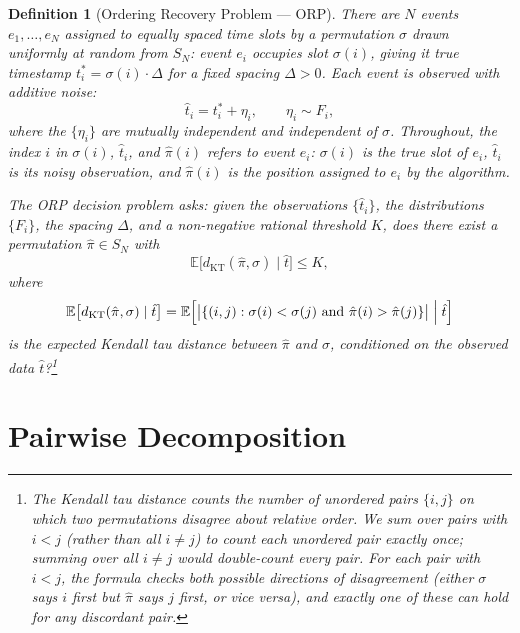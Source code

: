 \documentclass[11pt]{article}
\newtheorem{definition}{Definition}
\begin{document}
\begin{definition}[Ordering Recovery Problem --- ORP]
There are $N$ events $e_1, \ldots, e_N$ assigned to equally spaced time slots by a permutation $\sigma$ drawn uniformly at random from $S_N$: event $e_i$ occupies slot $\sigma(i)$, giving it true timestamp $t_i^* = \sigma(i) \cdot \Delta$ for a fixed spacing $\Delta > 0$. Each event is observed with additive noise:
\begin{equation}
\hat{t}_i = t_i^* + \eta_i, \qquad \eta_i \sim F_i,
\end{equation}
where the $\{\eta_i\}$ are mutually independent and independent of $\sigma$. Throughout, the index $i$ in $\sigma(i)$, $\hat{t}_i$, and $\hat{\pi}(i)$ refers to event $e_i$: $\sigma(i)$ is the true slot of $e_i$, $\hat{t}_i$ is its noisy observation, and $\hat{\pi}(i)$ is the position assigned to $e_i$ by the algorithm.

The ORP decision problem asks: given the observations $\{\hat{t}_i\}$, the distributions $\{F_i\}$, the spacing $\Delta$, and a non-negative rational threshold $K$, does there exist a permutation $\hat{\pi} \in S_N$ with
\begin{equation}
\mathbb{E}\bigl[d_{\mathrm{KT}}(\hat{\pi}, \sigma) \mid \hat{t}\bigr] \le K,
\end{equation}
where
\begin{equation}
\mathbb{E}\bigl[d_{\mathrm{KT}}(\hat{\pi}, \sigma) \mid \hat{t}\bigr] = \mathbb{E}\Bigl[\bigl|\{(i, j) : \sigma(i) < \sigma(j) \text{ and } \hat{\pi}(i) > \hat{\pi}(j)\}\bigr| \;\Big|\; \hat{t}\Bigr]
\end{equation}
is the expected Kendall tau distance between $\hat{\pi}$ and $\sigma$, conditioned on the observed data $\hat{t}$?\footnote{The Kendall tau distance counts the number of unordered pairs $\{i, j\}$ on which two permutations disagree about relative order. We sum over pairs with $i < j$ (rather than all $i \ne j$) to count each unordered pair exactly once; summing over all $i \ne j$ would double-count every pair. For each pair with $i < j$, the formula checks both possible directions of disagreement (either $\sigma$ says $i$ first but $\hat{\pi}$ says $j$ first, or vice versa), and exactly one of these can hold for any discordant pair.}
\end{definition}

\section{Pairwise Decomposition}
\end{document}
